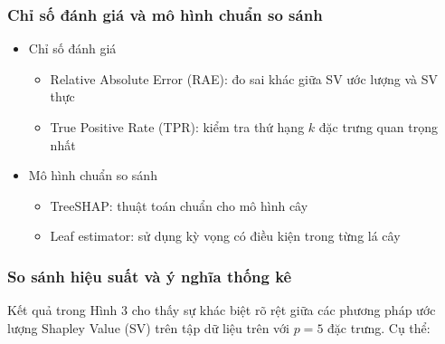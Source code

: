 \documentclass[12pt, a4paper]{article}
\begin{document}
\subsubsection{Chỉ số đánh giá và mô hình chuẩn so sánh}
        \begin{itemize}[align=parleft, left=4em, labelsep=1em, itemsep=0.5em]
                \item Chỉ số đánh giá
                  \begin{itemize}[label=$\circ$, left=1em, labelsep=0.75em, itemsep=0.5em]
                        \item Relative Absolute Error (RAE): đo sai khác giữa SV ước lượng và SV thực
                        \item True Positive Rate (TPR): kiểm tra thứ hạng $k$ đặc trưng quan trọng nhất
                    \end{itemize}
                \item Mô hình chuẩn so sánh
                      \begin{itemize}[label=$\circ$, left=1em, labelsep=0.75em, itemsep=0.5em]
                        \item TreeSHAP: thuật toán chuẩn cho mô hình cây
                        \item Leaf estimator: sử dụng kỳ vọng có điều kiện trong từng lá cây
                    \end{itemize}
        \end{itemize}

\subsubsection{So sánh hiệu suất và ý nghĩa thống kê}
\begin{adjustwidth}{2.0em}{0cm}
Kết quả trong Hình 3 cho thấy sự khác biệt rõ rệt giữa các phương pháp ước lượng Shapley Value (SV) trên tập dữ liệu trên với $p=5$ đặc trưng. Cụ thể:
\end{adjustwidth}
            
\end{document}
